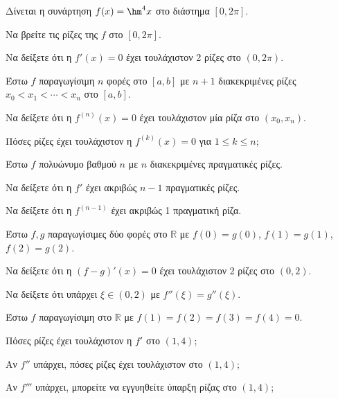 \documentclass[11pt,a4paper,modern]{FFExercises}
\begin{document}
\askhsh
Δίνεται η συνάρτηση $f(x) = \hm^4 x$ στο διάστημα $[0, 2\pi]$.
\begin{alist}
  \item Να βρείτε τις ρίζες της $f$ στο $[0, 2\pi]$.
  \item Να δείξετε ότι η $f'(x) = 0$ έχει τουλάχιστον 2 ρίζες στο $(0, 2\pi)$.
\end{alist}


\askhsh
Έστω $f$ παραγωγίσιμη $n$ φορές στο $[a, b]$ με $n+1$ διακεκριμένες ρίζες $x_0 < x_1 < \cdots < x_n$ στο $[a, b]$.
\begin{alist}
  \item Να δείξετε ότι η $f^{(n)}(x) = 0$ έχει τουλάχιστον μία ρίζα στο $(x_0, x_n)$.
  \item Πόσες ρίζες έχει τουλάχιστον η $f^{(k)}(x) = 0$ για $1 \leq k \leq n$;
\end{alist}

\askhsh
Έστω $f$ πολυώνυμο βαθμού $n$ με $n$ διακεκριμένες πραγματικές ρίζες.
\begin{alist}
  \item Να δείξετε ότι η $f'$ έχει ακριβώς $n-1$ πραγματικές ρίζες.
  \item Να δείξετε ότι η $f^{(n-1)}$ έχει ακριβώς 1 πραγματική ρίζα.
\end{alist}

\askhsh
Έστω $f, g$ παραγωγίσιμες δύο φορές στο $\mathbb{R}$ με $f(0) = g(0)$, $f(1) = g(1)$, $f(2) = g(2)$.
\begin{alist}
  \item Να δείξετε ότι η $(f-g)'(x) = 0$ έχει τουλάχιστον 2 ρίζες στο $(0, 2)$.
  \item Να δείξετε ότι υπάρχει $\xi \in (0, 2)$ με $f''(\xi) = g''(\xi)$.
\end{alist}

\askhsh
Έστω $f$ παραγωγίσιμη στο $\mathbb{R}$ με $f(1) = f(2) = f(3) = f(4) = 0$.
\begin{alist}
  \item Πόσες ρίζες έχει τουλάχιστον η $f'$ στο $(1, 4)$;
  \item Αν $f''$ υπάρχει, πόσες ρίζες έχει τουλάχιστον στο $(1, 4)$;
  \item Αν $f'''$ υπάρχει, μπορείτε να εγγυηθείτε ύπαρξη ρίζας στο $(1, 4)$;
\end{alist}

\end{document}
